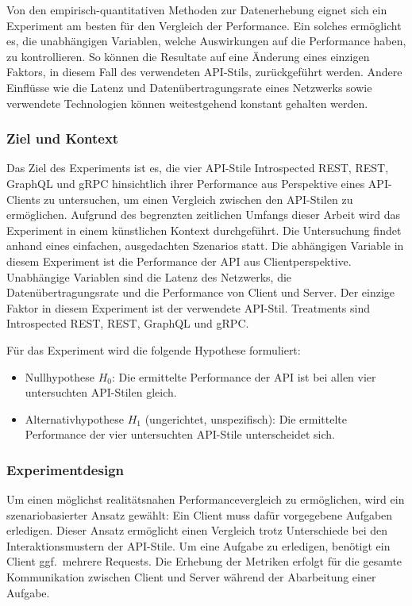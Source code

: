 Von den empirisch-quantitativen Methoden zur Datenerhebung eignet sich ein Experiment am besten für den Vergleich der Performance. Ein solches ermöglicht es, die unabhängigen Variablen, welche Auswirkungen auf die Performance haben, zu kontrollieren. So können die Resultate auf eine Änderung eines einzigen Faktors, in diesem Fall des verwendeten API-Stils, zurückgeführt werden. Andere Einflüsse wie die Latenz und Datenübertragungsrate eines Netzwerks sowie verwendete Technologien können weitestgehend konstant gehalten werden.

\subsubsection{Ziel und Kontext}
Das Ziel des Experiments ist es, die vier API-Stile Introspected REST, REST, GraphQL und gRPC hinsichtlich ihrer Performance aus Perspektive eines API-Clients zu untersuchen, um einen Vergleich zwischen den API-Stilen zu ermöglichen. Aufgrund des begrenzten zeitlichen Umfangs dieser Arbeit wird das Experiment in einem künstlichen Kontext durchgeführt. Die Untersuchung findet anhand eines einfachen, ausgedachten Szenarios statt. Die abhängigen Variable in diesem Experiment ist die Performance der API aus Clientperspektive. Unabhängige Variablen sind die Latenz des Netzwerks, die Datenübertragungsrate und die Performance von Client und Server. Der einzige Faktor in diesem Experiment ist der verwendete API-Stil. Treatments sind Introspected REST, REST, GraphQL und gRPC.

\para{}Für das Experiment wird die folgende Hypothese formuliert:

\begin{itemize}[noitemsep,topsep=0pt]
    \item Nullhypothese \(H_0\): Die ermittelte Performance der API ist bei allen vier untersuchten API-Stilen gleich.
    \item Alternativhypothese \(H_1\) (ungerichtet, unspezifisch): Die ermittelte Performance der vier untersuchten API-Stile unterscheidet sich. 
\end{itemize}

\subsubsection{Experimentdesign}
Um einen möglichst realitätsnahen Performancevergleich zu ermöglichen, wird ein szenariobasierter Ansatz gewählt: Ein Client muss dafür vorgegebene Aufgaben erledigen. Dieser Ansatz ermöglicht einen Vergleich trotz Unterschiede bei den Interaktionsmustern der API-Stile. Um eine Aufgabe zu erledigen, benötigt ein Client ggf.\ mehrere Requests. Die Erhebung der Metriken erfolgt für die gesamte Kommunikation zwischen Client und Server während der Abarbeitung einer Aufgabe.


